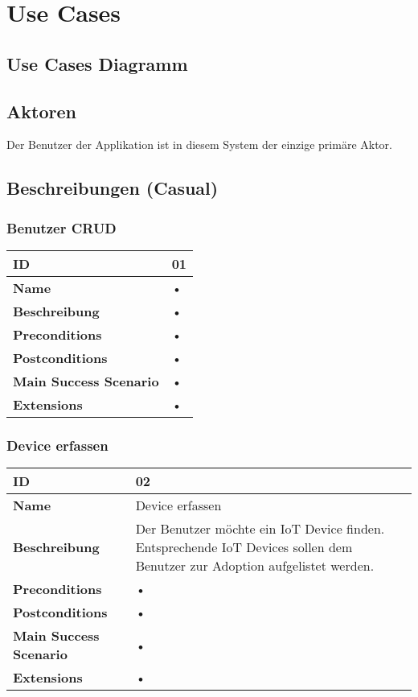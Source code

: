 \section{Use Cases}
\subsection{Use Cases Diagramm}
\subsection{Aktoren}
Der Benutzer der Applikation ist in diesem System der einzige primäre Aktor.
\subsection{Beschreibungen (Casual)}
\subsubsection{Benutzer CRUD}
\mbox{}
\begin{longtable}{| p{4cm} | p{11.7cm} |}
 \hline
 \textbf{ID} & 01 \\ \hline 
 \textbf{Name} & • \\ \hline 
 \textbf{Beschreibung} & • \\ \hline 
 \textbf{Preconditions} & • \\ \hline 
 \textbf{Postconditions} & • \\ \hline 
 \textbf{Main Success Scenario} & • \\ \hline 
 \textbf{Extensions} & • \\ \hline 
 \end{longtable}

\subsubsection{Device erfassen}
\mbox{}
\begin{longtable}{| p{4cm} | p{11.7cm} |}
 \hline
 \textbf{ID} & 02\\ \hline 
 \textbf{Name} & Device erfassen \\ \hline 
 \textbf{Beschreibung} & Der Benutzer möchte ein IoT Device finden. Entsprechende IoT Devices sollen dem Benutzer zur Adoption aufgelistet werden. \\ \hline 
 \textbf{Preconditions} & • \\ \hline 
 \textbf{Postconditions} & • \\ \hline 
 \textbf{Main Success Scenario} & • \\ \hline 
 \textbf{Extensions} & • \\ \hline 
\end{longtable}

